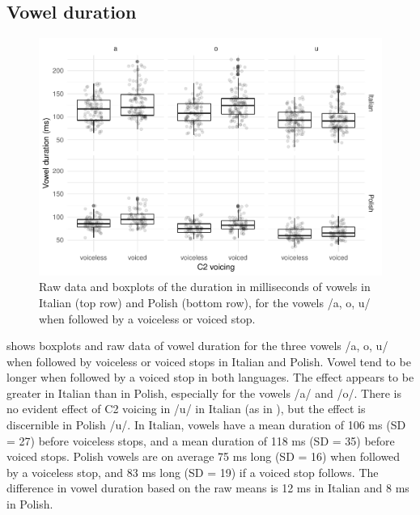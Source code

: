 \documentclass[12pt,]{article}
\begin{document}
\hypertarget{vowel-duration}{%
\subsection{Vowel duration}\label{vowel-duration}}

\label{s:vduration}

\begin{figure}
\includegraphics[width=\linewidth]{2018-relrel_files/figure-latex/Figure2} \caption{Raw data and boxplots of the duration in milliseconds of vowels in Italian (top row) and Polish (bottom row), for the vowels /a, o, u/ when followed by a voiceless or voiced stop.}\label{f:Figure2}
\end{figure}

 shows boxplots and raw data of vowel duration for the
three vowels /a, o, u/ when followed by voiceless or voiced stops in
Italian and Polish. Vowel tend to be longer when followed by a voiced
stop in both languages. The effect appears to be greater in Italian than
in Polish, especially for the vowels /a/ and /o/. There is no evident
effect of C2 voicing in /u/ in Italian (as in \citealt{ferrero1978}),
but the effect is discernible in Polish /u/. In Italian, vowels have a
mean duration of 106 ms (SD = 27) before voiceless stops, and a mean
duration of 118 ms (SD = 35) before voiced stops. Polish vowels are on
average 75 ms long (SD = 16) when followed by a voiceless stop, and 83
ms long (SD = 19) if a voiced stop follows. The difference in vowel
duration based on the raw means is 12 ms in Italian and 8 ms in Polish.
\end{document}
